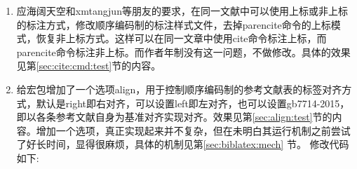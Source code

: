 \label{up:161207}
\begin{enumerate}
\item 应海阔天空和xmtangjun等朋友的要求，在同一文献中可以使用上标或非上标的标注方式，修改顺序编码制的标注样式文件，去掉parencite命令的上标模式，恢复非上标方式。这样可以在同一文章中使用cite命令标注上标，而parencite命令标注非上标。而作者年制没有这一问题，不做修改。具体的效果见第\ref{sec:cite:cmd:test}节的内容。

\item 给宏包增加了一个选项align，用于控制顺序编码制的参考文献表的标签对齐方式，默认是right即右对齐，可以设置left即左对齐，也可以设置gb7714-2015，即以各条参考文献自身为基准对齐实现对齐。效果见第\ref{sec:align:test}节的内容。增加一个选项，真正实现起来并不复杂，但在未明白其运行机制之前尝试了好长时间，显得很麻烦，具体的机制见第\ref{sec:biblatex:mech} 节。
    修改代码如下:
\end{enumerate}
